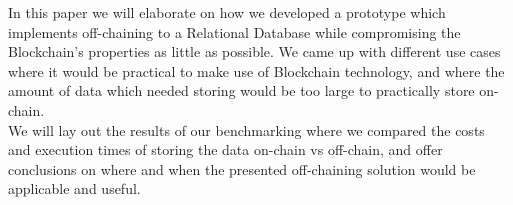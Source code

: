 In this paper we will elaborate on how we developed a prototype which implements off-chaining to a Relational Database while compromising the Blockchain’s properties as little as possible. We came up with different use cases where it would be practical to make use of Blockchain technology, and where the amount of data which needed storing would be too large to practically store on-chain.\\
We will lay out the results of our benchmarking where we compared the costs and execution times of storing the data on-chain vs off-chain, and offer conclusions on where and when the presented off-chaining solution would be applicable and useful.


\newpage
